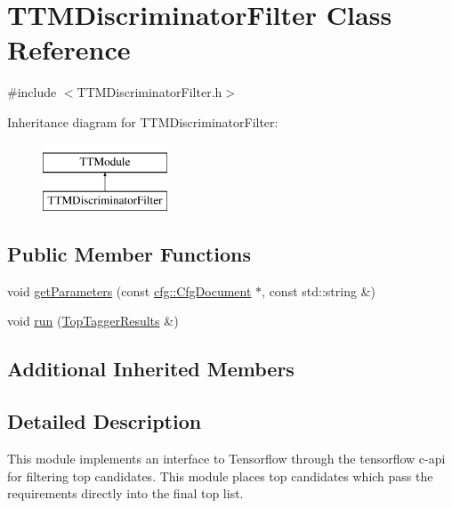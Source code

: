 \hypertarget{classTTMDiscriminatorFilter}{\section{T\-T\-M\-Discriminator\-Filter Class Reference}
\label{classTTMDiscriminatorFilter}
}


{\ttfamily \#include $<$T\-T\-M\-Discriminator\-Filter.\-h$>$}

Inheritance diagram for T\-T\-M\-Discriminator\-Filter\-:\begin{figure}[H]
\begin{center}
\leavevmode
\includegraphics[height=2.000000cm]{classTTMDiscriminatorFilter}
\end{center}
\end{figure}
\subsection*{Public Member Functions}
\begin{DoxyCompactItemize}
\item 
void \hyperlink{classTTMDiscriminatorFilter_afffc488bca7ff5cc89fc436edc927f9e}{get\-Parameters} (const \hyperlink{classcfg_1_1CfgDocument}{cfg\-::\-Cfg\-Document} $\ast$, const std\-::string \&)
\item 
void \hyperlink{classTTMDiscriminatorFilter_a72dbc7e987d75bcf96837f313d31d999}{run} (\hyperlink{classTopTaggerResults}{Top\-Tagger\-Results} \&)
\end{DoxyCompactItemize}
\subsection*{Additional Inherited Members}


\subsection{Detailed Description}
This module implements an interface to Tensorflow through the tensorflow c-\/api for filtering top candidates. This module places top candidates which pass the requirements directly into the final top list.


